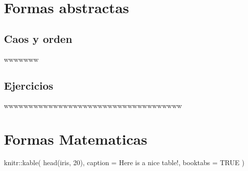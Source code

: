 \documentclass[
  16pt,
]{krantz}
\newenvironment{Shaded}{\begin{snugshade}}{\end{snugshade}}
\newcommand{\AttributeTok}[1]{\textcolor[rgb]{0.77,0.63,0.00}{#1}}
\newcommand{\ConstantTok}[1]{\textcolor[rgb]{0.00,0.00,0.00}{#1}}
\newcommand{\DecValTok}[1]{\textcolor[rgb]{0.00,0.00,0.81}{#1}}
\newcommand{\FunctionTok}[1]{\textcolor[rgb]{0.00,0.00,0.00}{#1}}
\newcommand{\NormalTok}[1]{#1}
\newcommand{\SpecialCharTok}[1]{\textcolor[rgb]{0.00,0.00,0.00}{#1}}
\newcommand{\StringTok}[1]{\textcolor[rgb]{0.31,0.60,0.02}{#1}}
\theoremstyle{definition}
\theoremstyle{definition}
\theoremstyle{definition}
\theoremstyle{definition}
\theoremstyle{remark}
\begin{document}
\hypertarget{formas-abstractas}{%
\chapter{Formas abstractas}\label{formas-abstractas}}

\hypertarget{caos-y-orden}{%
\section{Caos y orden}\label{caos-y-orden}}

\citep{bookdown2016}wwwwwww \citep{vincze2014college}

\hypertarget{ejercicios}{%
\section{Ejercicios}\label{ejercicios}}

wwwwwwwwwwwwwwwwwwwwwwwwwwwwwwwwwwww

\hypertarget{formas-matematicas}{%
\chapter{Formas Matematicas}\label{formas-matematicas}}

\begin{Shaded}
\begin{Highlighting}[]
\NormalTok{knitr}\SpecialCharTok{::}\FunctionTok{kable}\NormalTok{(}
  \FunctionTok{head}\NormalTok{(iris, }\DecValTok{20}\NormalTok{), }\AttributeTok{caption =} \StringTok{\textquotesingle{}Here is a nice table!\textquotesingle{}}\NormalTok{,}
  \AttributeTok{booktabs =} \ConstantTok{TRUE}
\NormalTok{)}
\end{Highlighting}
\end{Shaded}
\end{document}
